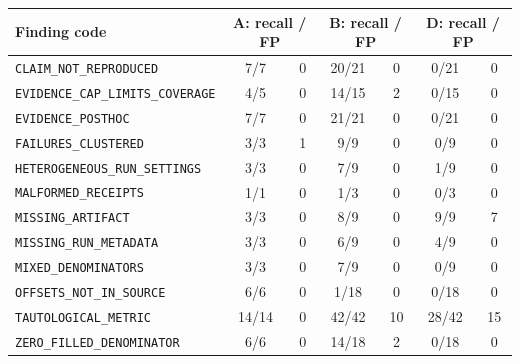 \begin{tabular}{@{}lcccccc@{}}
\toprule
Finding code & \multicolumn{2}{c}{A: recall / FP} & \multicolumn{2}{c}{B: recall / FP} & \multicolumn{2}{c}{D: recall / FP} \\
\midrule
\texttt{CLAIM\_NOT\_REPRODUCED} & 7/7 & 0 & 20/21 & 0 & 0/21 & 0 \\
\texttt{EVIDENCE\_CAP\_LIMITS\_COVERAGE} & 4/5 & 0 & 14/15 & 2 & 0/15 & 0 \\
\texttt{EVIDENCE\_POSTHOC} & 7/7 & 0 & 21/21 & 0 & 0/21 & 0 \\
\texttt{FAILURES\_CLUSTERED} & 3/3 & 1 & 9/9 & 0 & 0/9 & 0 \\
\texttt{HETEROGENEOUS\_RUN\_SETTINGS} & 3/3 & 0 & 7/9 & 0 & 1/9 & 0 \\
\texttt{MALFORMED\_RECEIPTS} & 1/1 & 0 & 1/3 & 0 & 0/3 & 0 \\
\texttt{MISSING\_ARTIFACT} & 3/3 & 0 & 8/9 & 0 & 9/9 & 7 \\
\texttt{MISSING\_RUN\_METADATA} & 3/3 & 0 & 6/9 & 0 & 4/9 & 0 \\
\texttt{MIXED\_DENOMINATORS} & 3/3 & 0 & 7/9 & 0 & 0/9 & 0 \\
\texttt{OFFSETS\_NOT\_IN\_SOURCE} & 6/6 & 0 & 1/18 & 0 & 0/18 & 0 \\
\texttt{TAUTOLOGICAL\_METRIC} & 14/14 & 0 & 42/42 & 10 & 28/42 & 15 \\
\texttt{ZERO\_FILLED\_DENOMINATOR} & 6/6 & 0 & 14/18 & 2 & 0/18 & 0 \\
\bottomrule
\end{tabular}
